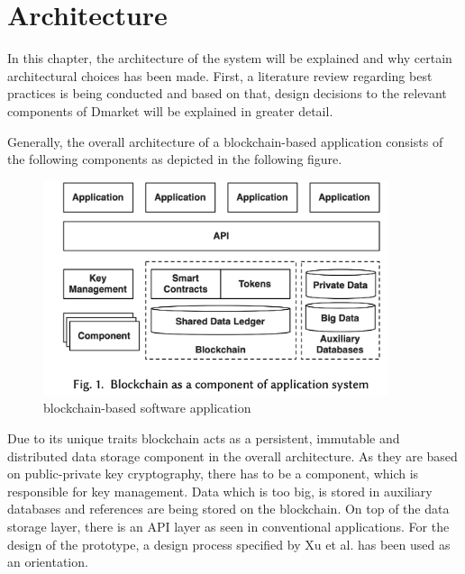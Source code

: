 \section{Architecture} 

In this chapter, the architecture of the system will be explained and why certain architectural choices has been made. First, a literature review regarding best practices is being conducted and based on that,  
design decisions to the relevant components of Dmarket will be explained in greater detail. 


Generally, the overall architecture of a blockchain-based application consists of the following components as depicted in the following figure. 

\begin{figure}[htbp]
    \centerline{\includegraphics[width=0.9\textwidth]{images/architecture.png}}
    \caption{blockchain-based software application \label{fig:techstack} \cite{xuPatternCollectionBlockchainbased2018}}
\end{figure}

Due to its unique traits blockchain acts as a persistent, immutable and distributed data storage component in the overall architecture. As they are based on public-private key cryptography, there has to be a component, which is responsible for key management. Data which is too big, is stored in auxiliary databases and references are being stored on the blockchain. On top of the data storage layer, there is an API layer as seen in conventional applications. For the design of the prototype, a design process specified by Xu et al. has been used as an orientation. 

